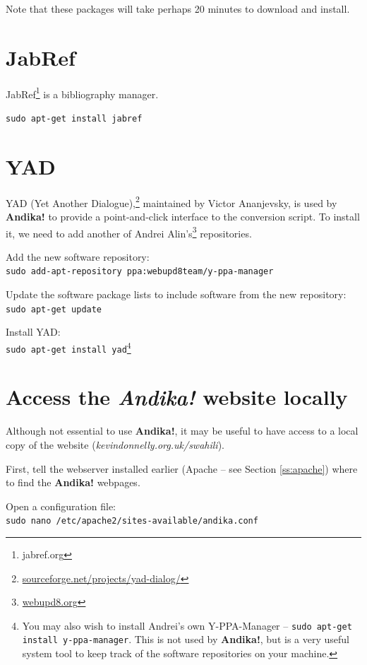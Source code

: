 Note that these packages will take perhaps 20 minutes to download and install.


\section{JabRef}
\label{s:jabref}

JabRef\footnote{jabref.org} is a bibliography manager.

\verb|sudo apt-get install jabref|


\section{YAD}

YAD (Yet Another Dialogue),\footnote{\url{sourceforge.net/projects/yad-dialog/}} maintained by Victor Ananjevsky, is used by \textbf{Andika!} to provide a point-and-click interface to the conversion script.  To install it, we need to add another of Andrei Alin's\footnote{\url{webupd8.org}} repositories.

Add the new software repository:\\
\verb|sudo add-apt-repository ppa:webupd8team/y-ppa-manager|

Update the software package lists to include software from the new repository:\\
\verb|sudo apt-get update|

Install YAD:\\
\verb|sudo apt-get install yad|\footnote{You may also wish to install Andrei's own Y-PPA-Manager -- \texttt{sudo apt-get install y-ppa-manager}.  This is not used by \textbf{Andika!}, but is a very useful system tool to keep track of the software repositories on your machine.}


\section{Access the \textit{Andika!} website locally}
\label{s:localaccess}

Although not essential to use \textbf{Andika!}, it may be useful to have access to a local copy of the website (\textit{kevindonnelly.org.uk/swahili}).  

First, tell the webserver installed earlier (Apache -- see Section \ref{ss:apache}) where to find the\textbf{ Andika!} webpages.

Open a configuration file:\\
\verb|sudo nano /etc/apache2/sites-available/andika.conf|

